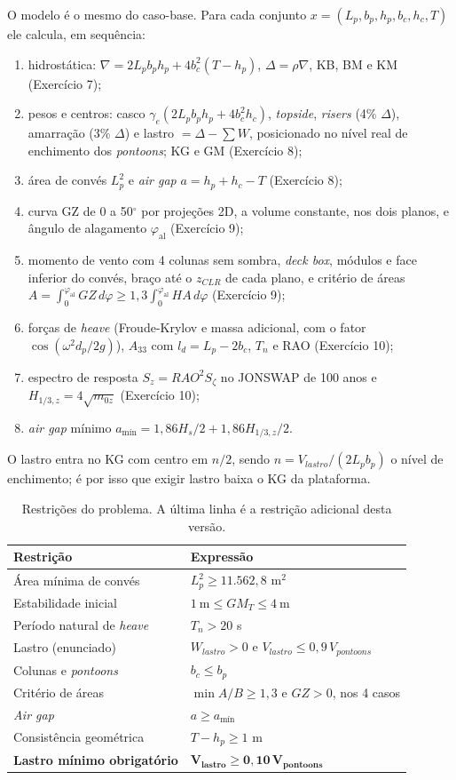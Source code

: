 \documentclass[11pt,a4paper]{article}
\newcommand{\phial}{\varphi_{\mathrm{al}}}
\newcommand{\Hz}{H_{1/3,z}}
\begin{document}
O modelo é o mesmo do caso-base. Para cada conjunto $x = (L_p, b_p, h_p, b_c, h_c, T)$ ele
calcula, em sequência:
\begin{enumerate}
\item hidrostática: $\nabla = 2L_pb_ph_p + 4b_c^2(T-h_p)$, $\Delta = \rho\nabla$, KB, BM e KM
(Exercício 7);
\item pesos e centros: casco $\gamma_e(2L_pb_ph_p + 4b_c^2h_c)$, \emph{topside}, \emph{risers}
(4\% $\Delta$), amarração (3\% $\Delta$) e lastro $= \Delta - \sum W$, posicionado no nível real
de enchimento dos \emph{pontoons}; KG e GM (Exercício 8);
\item área de convés $L_p^2$ e \emph{air gap} $a = h_p + h_c - T$ (Exercício 8);
\item curva GZ de 0 a 50$^\circ$ por projeções 2D, a volume constante, nos dois planos, e
ângulo de alagamento $\phial$ (Exercício 9);
\item momento de vento com 4 colunas sem sombra, \emph{deck box}, módulos e face inferior do
convés, braço até o $z_{CLR}$ de cada plano, e critério de áreas
$A = \int_0^{\phial} GZ\,d\varphi \ge 1{,}3\int_0^{\phial} HA\,d\varphi$ (Exercício 9);
\item forças de \emph{heave} (Froude-Krylov e massa adicional, com o fator
$\cos(\omega^2 d_p/2g)$), $A_{33}$ com $l_d = L_p - 2b_c$, $T_n$ e RAO (Exercício 10);
\item espectro de resposta $S_z = RAO^2 S_\zeta$ no JONSWAP de 100 anos e
$\Hz = 4\sqrt{m_{0z}}$ (Exercício 10);
\item \emph{air gap} mínimo $a_{\text{mín}} = 1{,}86H_s/2 + 1{,}86\Hz/2$.
\end{enumerate}
O lastro entra no KG com centro em $n/2$, sendo $n = V_{lastro}/(2L_pb_p)$ o nível de
enchimento; é por isso que exigir lastro baixa o KG da plataforma.

\begin{table}[H]
\centering
\caption{Restrições do problema. A última linha é a restrição adicional desta versão.}\label{tab:restricoes}
\begin{tabular}{ll}
\toprule
Restrição & Expressão \\
\midrule
Área mínima de convés & $L_p^2 \ge 11.562{,}8$ m$^2$ \\
Estabilidade inicial & $1~\text{m} \le GM_T \le 4~\text{m}$ \\
Período natural de \emph{heave} & $T_n > 20$ s \\
Lastro (enunciado) & $W_{lastro} > 0$ e $V_{lastro} \le 0{,}9\, V_{pontoons}$ \\
Colunas e \emph{pontoons} & $b_c \le b_p$ \\
Critério de áreas & $\min A/B \ge 1{,}3$ e $GZ > 0$, nos 4 casos \\
\emph{Air gap} & $a \ge a_{\text{mín}}$ \\
Consistência geométrica & $T - h_p \ge 1$ m \\
\midrule
\textbf{Lastro mínimo obrigatório} & $\mathbf{V_{lastro} \ge 0{,}10\, V_{pontoons}}$ \\
\bottomrule
\end{tabular}
\end{table}
\end{document}
